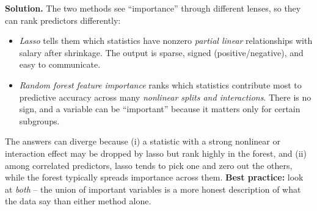 \documentclass[11pt]{article}
\newcommand{\solution}[1]{%
  \par\medskip\noindent\textbf{Solution.} #1\par\medskip
}
\begin{document}
\begin{enumerate}[leftmargin=*]
\solution{The two methods see ``importance'' through different lenses, so they can rank predictors differently:
\begin{itemize}
\item \emph{Lasso} tells them which statistics have nonzero \emph{partial linear} relationships with salary after shrinkage. The output is sparse, signed (positive/negative), and easy to communicate.
\item \emph{Random forest feature importance} ranks which statistics contribute most to predictive accuracy across many \emph{nonlinear splits and interactions}. There is no sign, and a variable can be ``important'' because it matters only for certain subgroups.
\end{itemize}
The answers can diverge because (i) a statistic with a strong nonlinear or interaction effect may be dropped by lasso but rank highly in the forest, and (ii) among correlated predictors, lasso tends to pick one and zero out the others, while the forest typically spreads importance across them. \textbf{Best practice:} look at \emph{both} -- the union of important variables is a more honest description of what the data say than either method alone.}

\end{enumerate}
\end{document}
